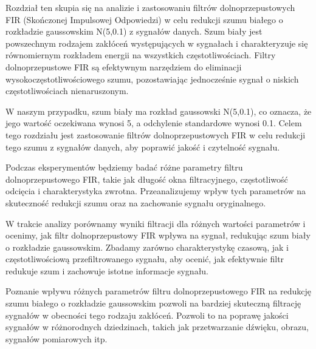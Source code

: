 \documentclass[11pt]{article}
\begin{document}
Rozdział ten skupia się na analizie i zastosowaniu filtrów
dolnoprzepustowych FIR (Skończonej Impulsowej Odpowiedzi) w celu
redukcji szumu białego o rozkładzie gaussowskim N(5,0.1) z sygnałów
danych. Szum biały jest powszechnym rodzajem zakłóceń występujących w
sygnałach i charakteryzuje się równomiernym rozkładem energii na
wszystkich częstotliwościach. Filtry dolnoprzepustowe FIR są efektywnym
narzędziem do eliminacji wysokoczęstotliwościowego szumu, pozostawiając
jednocześnie sygnał o niskich częstotliwościach nienaruszonym.

W naszym przypadku, szum biały ma rozkład gaussowski N(5,0.1), co
oznacza, że jego wartość oczekiwana wynosi 5, a odchylenie standardowe
wynosi 0.1. Celem tego rozdziału jest zastosowanie filtrów
dolnoprzepustowych FIR w celu redukcji tego szumu z sygnałów danych, aby
poprawić jakość i czytelność sygnału.

Podczas eksperymentów będziemy badać różne parametry filtru
dolnoprzepustowego FIR, takie jak długość okna filtracyjnego,
częstotliwość odcięcia i charakterystyka zwrotna. Przeanalizujemy wpływ
tych parametrów na skuteczność redukcji szumu oraz na zachowanie sygnału
oryginalnego.

W trakcie analizy porównamy wyniki filtracji dla różnych wartości
parametrów i ocenimy, jak filtr dolnoprzepustowy FIR wpływa na sygnał,
redukując szum biały o rozkładzie gaussowskim. Zbadamy zarówno
charakterystykę czasową, jak i częstotliwościową przefiltrowanego
sygnału, aby ocenić, jak efektywnie filtr redukuje szum i zachowuje
istotne informacje sygnału.

Poznanie wpływu różnych parametrów filtru dolnoprzepustowego FIR na
redukcję szumu białego o rozkładzie gaussowskim pozwoli na bardziej
skuteczną filtrację sygnałów w obecności tego rodzaju zakłóceń. Pozwoli
to na poprawę jakości sygnałów w różnorodnych dziedzinach, takich jak
przetwarzanie dźwięku, obrazu, sygnałów pomiarowych itp.
\end{document}

